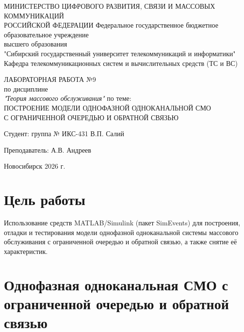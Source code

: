 \documentclass[a4paper,14pt,oneside,openany]{memoir}
\begin{document}
\thispagestyle{empty}
\begin{center}
    МИНИСТЕРСТВО ЦИФРОВОГО РАЗВИТИЯ, СВЯЗИ И МАССОВЫХ КОММУНИКАЦИЙ \\ РОССИЙСКОЙ ФЕДЕРАЦИИ
    \vspace{20pt}
    Федеральное государственное бюджетное образовательное учреждение \\ высшего образования \\
    "Сибирский государственный университет телекоммуникаций и информатики" \\
    \vspace{20pt}
    Кафедра телекоммуникационных систем и вычислительных средств (ТС и ВС)
\end{center}
\vfill
\begin{center}
    ЛАБОРАТОРНАЯ РАБОТА №9 \\
    по дисциплине \\
    \textit{"Теория массового обслуживания"}
    \vspace{20pt}
    по теме: \\
    \uppercase{Построение модели однофазной одноканальной СМО \\ с ограниченной очередью и обратной связью}
\end{center}
\vfill
\noindent Студент: группа № ИКС-431 \hfill В.П. Салий

\vspace{20pt}

\noindent Преподаватель: \hfill А.В. Андреев
\vfill
\begin{center}
    Новосибирск 2026 г.
\end{center}

\newpage
\setcounter{page}{2}
\OnehalfSpacing*

\chapter*{Цель работы}
Использование средств MATLAB/Simulink (пакет SimEvents) для построения, отладки и тестирования модели однофазной одноканальной системы массового обслуживания с ограниченной очередью и обратной связью, а также снятие её характеристик.

\chapter{Однофазная одноканальная СМО с ограниченной очередью и обратной связью}
\label{ch:lab9}
\end{document}
